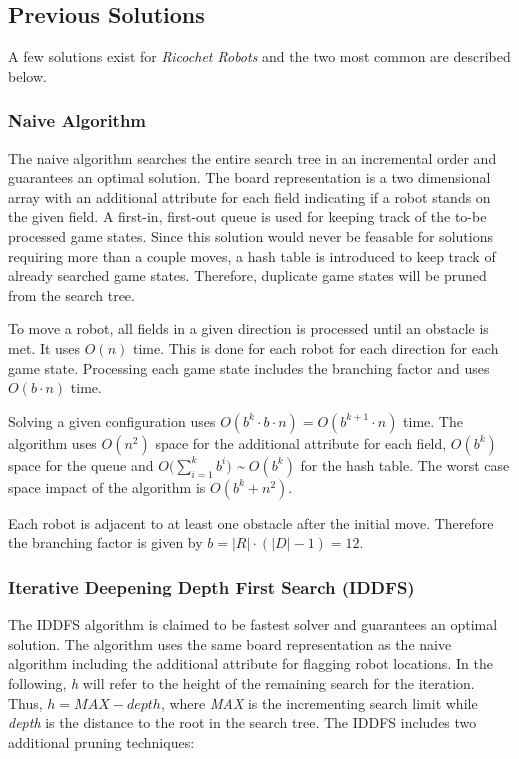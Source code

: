 \documentclass[]{article}
\begin{document}
\subsection{Previous Solutions}\label{previous-solutions}

A few solutions exist for \emph{Ricochet Robots} and the two most common
are described below.

\subsubsection{Naive Algorithm}\label{naive-algorithm}

The naive algorithm searches the entire search tree in an incremental
order and guarantees an optimal solution. The board representation is a
two dimensional array with an additional attribute for each field
indicating if a robot stands on the given field. A first-in, first-out
queue is used for keeping track of the to-be processed game states.
Since this solution would never be feasable for solutions requiring more
than a couple moves, a hash table is introduced to keep track of already
searched game states. Therefore, duplicate game states will be pruned
from the search tree.

To move a robot, all fields in a given direction is processed until an
obstacle is met. It uses \(O(n)\) time. This is done for each robot for
each direction for each game state. Processing each game state includes
the branching factor and uses \(O(b \cdot n)\) time.

Solving a given configuration uses
\(O(b^k \cdot b \cdot n) = O(b^{k+1} \cdot n)\) time. The algorithm uses
\(O(n^2)\) space for the additional attribute for each field, \(O(b^k)\)
space for the queue and \(O \Big(\sum\limits_{i=1}^k b^i \Big)\)
\emph{\textasciitilde{}} \(O(b^k)\) for the hash table. The worst case
space impact of the algorithm is \(O(b^k + n^2)\).

Each robot is adjacent to at least one obstacle after the initial move.
Therefore the branching factor is given by
\(b = |R| \cdot (|D|-1) = 12\).

\subsubsection{Iterative Deepening Depth First Search
(IDDFS)}\label{iterative-deepening-depth-first-search-iddfs}

The IDDFS algorithm is claimed to be fastest solver and guarantees an
optimal solution. The algorithm uses the same board representation as
the naive algorithm including the additional attribute for flagging
robot locations. In the following, \emph{h} will refer to the height of
the remaining search for the iteration. Thus, \(h = MAX - depth\), where
\emph{MAX} is the incrementing search limit while \emph{depth} is the
distance to the root in the search tree. The IDDFS includes two
additional pruning techniques:
\end{document}
